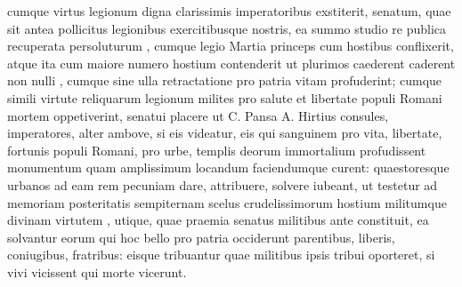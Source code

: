  cumque virtus legionum digna clarissimis imperatoribus exstiterit, senatum, quae sit antea pollicitus legionibus exercitibusque nostris, ea summo studio re publica recuperata persoluturum , cumque legio Martia princeps cum hostibus conflixerit, atque ita cum maiore numero hostium contenderit ut plurimos caederent caderent non nulli , cumque sine ulla retractatione pro patria vitam profuderint; cumque simili virtute reliquarum legionum milites pro salute et libertate populi Romani mortem oppetiverint, senatui placere ut C. Pansa A. Hirtius consules, imperatores, alter ambove, si eis videatur, eis qui sanguinem pro vita, libertate, fortunis populi Romani, pro urbe, templis deorum immortalium profudissent monumentum quam amplissimum locandum faciendumque curent: quaestoresque urbanos ad eam rem pecuniam dare, attribuere, solvere iubeant, ut testetur ad memoriam posteritatis sempiternam scelus crudelissimorum hostium militumque divinam virtutem , utique, quae praemia senatus militibus ante constituit, ea solvantur eorum qui hoc bello pro patria occiderunt parentibus, liberis, coniugibus, fratribus: eisque tribuantur quae militibus ipsis tribui oporteret, si vivi vicissent qui morte vicerunt.
